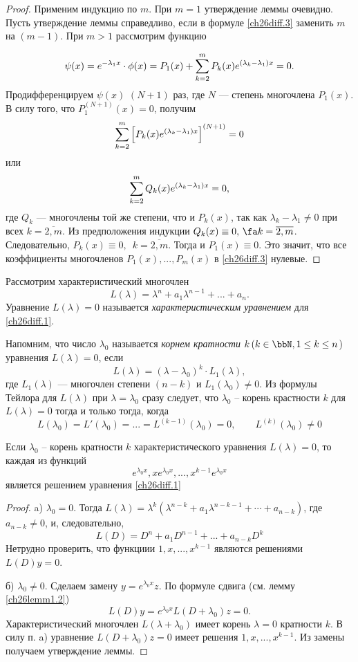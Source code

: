 \begin{proof}
Применим индукцию по $m$. При $m=1$ утверждение леммы очевидно. Пусть утверждение леммы справедливо, если в формуле \eqref{ch26diff.3} заменить $m$ на $(m-1)$. При $m>1$ рассмотрим функцию

$$
\psi(x)=e^{-\lambda_1x}\cdot\phi(x)=P_1(x)+ \sum_{k=2}^{m}\limits P_k(x)e^{(\lambda_k-\lambda_1)x}=0.
$$
Продифференцируем $\psi(x)$ $(N+1)$ раз, где $N$ --- степень многочлена $P_1(x)$. В силу того, что $P_1^{(N+1)}(x)=0$, получим 
$$
\sum_{k=2}^{m}\limits\left[P_k(x)e^{(\lambda_k-\lambda_1)x}\right]^{(N+1)}=0
$$
или
$$
\sum_{k=2}^{m}\limits Q_k(x)e^{(\lambda_k-\lambda_1)x}=0,
$$
где $Q_k$ --- многочлены той же степени, что и $P_k(x)$, так как $\lambda_k-\lambda_1 \neq 0$ при всех $k=\overline{2,m}$. Из предположения индукции $Q_k(x)\equiv 0,\,\fa k=\overline{2,m}$. Следовательно, $P_k(x)\equiv 0,\,$ $k=\overline{2,m}$. Тогда и $P_1(x)\equiv 0$. Это значит, что все коэффициенты многочленов $P_1(x),...,P_m(x)$ в \eqref{ch26diff.3} нулевые.
\end{proof}

Рассмотрим характеристический многочлен
$$
L(\lambda)=\lambda^n+a_1\lambda^{n-1}+...+a_n.
$$
Уравнение $L(\lambda)=0$ называется \textit{характеристическим уравнением} для \eqref{ch26diff.1}.

Напомним, что число $\lambda_0$ называется \textit{корнем кратности} $k\,(k\in\bbN, 1\leq k \leq n$) уравнения $L(\lambda)=0$, если
$$
L(\lambda)=(\lambda-\lambda_0)^k\cdot L_1(\lambda),
$$
где $L_1(\lambda)$ --- многочлен степени $(n-k)$ и $L_1(\lambda_0)\neq 0$. Из формулы Тейлора для $L(\lambda)$ при $\lambda=\lambda_0$ сразу следует, что  $\lambda_0$ -- корень крастности $k$ для $L(\lambda)=0$ тогда и только тогда, когда
$$
L(\lambda_0)=L'(\lambda_0)=...=L^{(k-1)}(\lambda_0)=0, \qquad L^{(k)}(\lambda_0)\neq 0
$$

\begin{lemm} \label{ch26lemm2.3}
Если $\lambda_0$ -- корень кратности $k$ характеристического уравнения $L(\lambda)=0$, то каждая из функций 
$$
e^{\lambda_0 x},xe^{\lambda_0 x},...,x^{k-1}e^{\lambda_0 x}
$$
является решением уравнения \eqref{ch26diff.1}
\end{lemm}

\begin{proof}

a) $\lambda_0=0$. Тогда $L(\lambda)=\lambda^k(\lambda^{n-k}+a_1\lambda^{n-k-1}+\cdots+a_{n-k})$, где  $a_{n-k}\neq 0$, и, следовательно,
$$
L(D)=D^n+a_1D^{n-1}+...+a_{n-k}D^k
$$
Нетрудно проверить, что функциии $1,x,...,x^{k-1}$ являются решениями $L(D)y=0$.

б) $\lambda_0\neq 0$. Сделаем замену $y=e^{\lambda_0x}z$. По формуле сдвига (см. лемму \ref{ch26lemm1.2})
$$
L(D)y=e^{\lambda_0x}L(D+\lambda_0)z=0.
$$
Характеристический многочлен $L(\lambda+\lambda_0)$ имеет корень $\lambda=0$ кратности $k$. В силу п. a) уравнение $L(D+\lambda_0)z=0$ имеет решения $1,x,...,x^{k-1}$. Из замены получаем утверждение леммы.
\end{proof}


